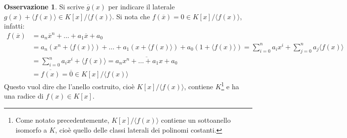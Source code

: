 \documentclass[11pt, a4paper]{scrartcl}
\theoremstyle{definition}
\numberwithin{esempio}{section}
\theoremstyle{definition}
\newtheorem{obs}{Osservazione}
\numberwithin{obs}{section}
\numberwithin{nota}{section}
\numberwithin{equation}{subsection}
\begin{document}
\begin{obs}
	Si scrive $\overline{g}(x)$ per indicare il laterale $g(x) + \langle f(x) \rangle \in K[x] / \langle f(x) \rangle$.
	Si nota che $f(\overline{x}) = 0 \in K[x] / \langle f(x) \rangle$, infatti:
	\[
	\begin{split}
		f(\overline{x}) &= a_n \overline{x}^n + \ldots + a_1 \overline{x} + a_0\\
				&=a_n (x^n + \langle f(x) \rangle) + \ldots + a_1 (x + \langle f(x) \rangle) + a_0 (1 + \langle f(x) \rangle) = \sum_{i=0}^{n} a_i x^i + \sum_{j=0}^{n} a_j \langle f(x) \rangle\\
				&= \sum_{i=0}^{n} a_ix^i + \langle f(x) \rangle = \overline{a_nx^n + \ldots + a_1 x + a_0}\\
				&= \overline{f(x)}= \overline{0} \in K[x] / \langle f(x) \rangle
	\end{split}
	\] 
	Questo vuol dire che l'anello costruito, cio\`e $K[x] / \langle f(x) \rangle$, contiene $K$\footnote{Come notato precedentemente, $K[x] / \langle f(x) \rangle$ contiene un sottoanello isomorfo a $K$, cio\`e quello delle classi laterali dei polinomi costanti.} e ha una radice di $f(x) \in K[x]$.
\end{obs}
\end{document}
